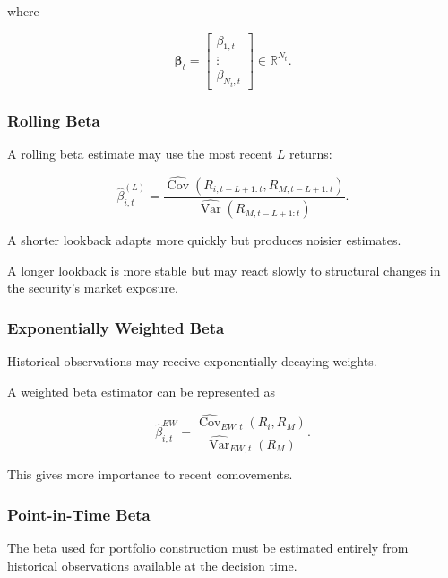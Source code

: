 \documentclass[11pt,a4paper]{article}
\begin{document}
where

\begin{equation}
\boldsymbol{\beta}_t
=
\begin{bmatrix}
\beta_{1,t}\\
\vdots\\
\beta_{N_t,t}
\end{bmatrix}
\in
\mathbb{R}^{N_t}.
\end{equation}


\subsubsection{Rolling Beta}

A rolling beta estimate may use the most recent $L$ returns:

\begin{equation}
\widehat{\beta}_{i,t}^{(L)}
=
\frac{
\widehat{\operatorname{Cov}}
\left(
R_{i,t-L+1:t},
R_{M,t-L+1:t}
\right)
}{
\widehat{\operatorname{Var}}
\left(
R_{M,t-L+1:t}
\right)
}.
\end{equation}

A shorter lookback adapts more quickly but produces noisier estimates.

A longer lookback is more stable but may react slowly to structural changes in
the security's market exposure.


\subsubsection{Exponentially Weighted Beta}

Historical observations may receive exponentially decaying weights.

A weighted beta estimator can be represented as

\begin{equation}
\boxed{
\widehat{\beta}_{i,t}^{EW}
=
\frac{
\widehat{\operatorname{Cov}}_{EW,t}
\left(
R_i,R_M
\right)
}{
\widehat{\operatorname{Var}}_{EW,t}
\left(
R_M
\right)
}.
}
\end{equation}

This gives more importance to recent comovements.


\subsubsection{Point-in-Time Beta}

The beta used for portfolio construction must be estimated entirely from
historical observations available at the decision time.
\end{document}
